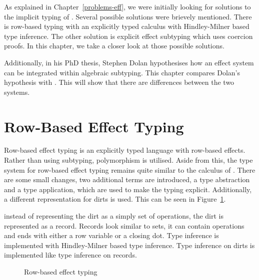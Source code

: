 As explained in Chapter~\ref{problems-eff}, we were initially looking for solutions to the implicit typing of \eff. Several possible solutions were brievely mentioned. There is row-based typing with an explicitly typed calculus with Hindley-Milner based type inference. The other solution is explicit effect subtyping which uses coercion proofs. In this chapter, we take a closer look at those possible solutions. 

Additionally, in his PhD thesis, Stephen Dolan hypothesises how an effect system can be integrated within algebraic subtyping. This chapter compares Dolan's hypothesis with \core. This will show that there are differences between the two systems.

\section{Row-Based Effect Typing}
Row-based effect typing is an explicitly typed language with row-based effects. \cite{row-optimised} Rather than using subtyping, polymorphism is utilised. Aside from this, the type system for row-based effect typing remains quite similar to the calculus of \eff. There are some small changes, two additional terms are introduced, a type abstraction and a type application, which are used to make the typing explicit. Additionally, a different representation for dirts is used. This can be seen in Figure~\ref{fig:explicit}.

instead of representing the dirt as a simply set of operations, the dirt is represented as a record. Records look similar to sets, it can contain operations and ends with either a row variable or a closing dot. Type inference is implemented with Hindley-Milner based type inference. Type inference on dirts is implemented like type inference on records. 

\begin{figure}[h]
\begin{center}
\end{center}
\caption{Row-based effect typing}\label{fig:explicit}
\end{figure}

